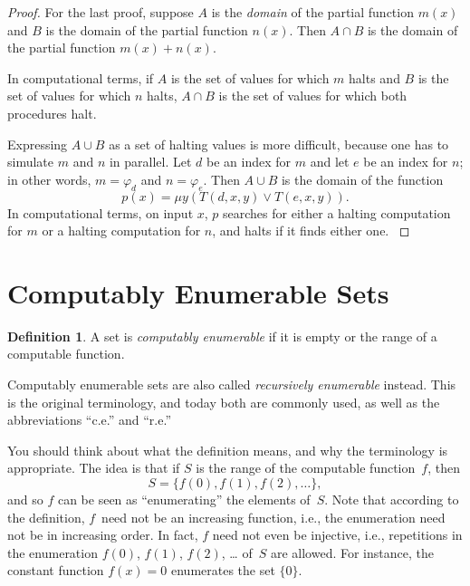 \documentclass[10pt,a4paper]{article}
\theoremstyle{plain}
\theoremstyle{definition}
\newtheorem{defn}[thm]{Definition}
\theoremstyle{remark}
\newenvironment{explain}{}{}
\newenvironment{history}{}{}
\newcommand*{\olfileid}[3]{}
\newcommand*{\olsection}[1]{\section*{#1}}
\providecommand{\cfind}[1]{\varphi_{#1}}
\providecommand{\umin}{\mu}
\begin{document}
\begin{proof}
For the last proof, suppose $A$ is the \emph{domain} of the partial
function $m(x)$ and $B$ is the domain of the partial function
$n(x)$. Then $A \cap B$ is the domain of the partial function $m(x) +
n(x)$.

\begin{explain}
In computational terms, if $A$ is the set of values for which
$m$ halts and $B$ is the set of values for which $n$ halts, $A \cap B$
is the set of values for which both procedures halt.
\end{explain}

Expressing $A \cup B$ as a set of halting values is more difficult,
because one has to simulate $m$ and $n$ in parallel. Let $d$ be an
index for $m$ and let $e$ be an index for $n$; in other words, $m =
\cfind{d}$ and $n = \cfind{e}$. Then $A \cup B$ is the domain of the
function
\[
p(x) = \umin{y}{(T(d,x,y) \lor T(e,x,y))}.
\]
\begin{explain}
In computational terms, on input $x$, $p$ searches for either a
halting computation for $m$ or a halting computation for $n$, and
halts if it finds either one.
\end{explain}
\end{proof}





\olfileid{cmp}{thy}{ces}
\olsection{Computably Enumerable Sets}

\begin{defn}
A set is \emph{computably enumerable} if it is empty or the range of a
computable function.
\end{defn}

\begin{history}
Computably enumerable sets are also called \emph{recursively
  enumerable} instead. This is the original terminology, and today
both are commonly used, as well as the abbreviations ``c.e.'' and
``r.e.''
\end{history}

\begin{explain}
You should think about what the definition means, and why the
terminology is appropriate. The idea is that if $S$ is the range of
the computable function~$f$, then
\[
S = \{ f(0), f(1), f(2), \dots \},
\]
and so $f$ can be seen as ``enumerating'' the elements of~$S$. Note
that according to the definition, $f$~need not be an increasing
function, i.e., the enumeration need not be in increasing order. In
fact, $f$ need not even be injective, i.e., repetitions in the
enumeration $f(0)$, $f(1)$, $f(2)$, \dots{} of~$S$ are allowed. For
instance, the constant function $f(x) = 0$ enumerates the set $\{ 0
\}$.
\end{explain}
\end{document}
